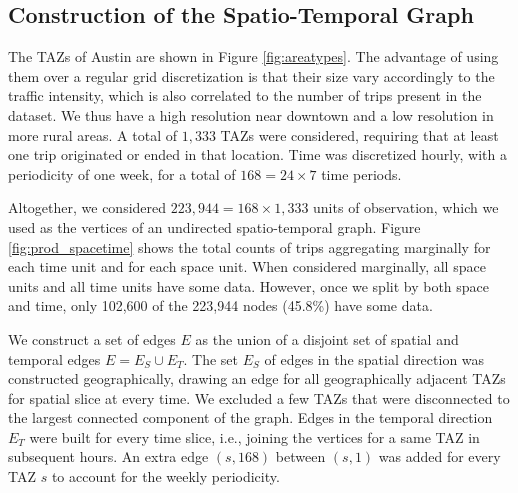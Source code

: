 \documentclass[a4paper, 11pt]{article}
\begin{document}
\subsection{Construction of the Spatio-Temporal Graph}
\label{section:graph}

The TAZs of Austin are shown in Figure \ref{fig:areatypes}. The advantage of using them over a regular grid discretization is that their size vary accordingly to the traffic intensity, which is also correlated to the number of trips present in the dataset. We thus have a high resolution near downtown and a low resolution in more rural areas. A total of $1,333$ TAZs were considered, requiring that at least one trip originated or ended in that location. Time was discretized hourly, with a periodicity of one week, for a total of $168=24\times7$ time periods.

Altogether, we considered $223,944=168\times1,333$ units of observation, which we used as the vertices of an undirected spatio-temporal graph. Figure \ref{fig:prod_spacetime} shows the total counts of trips aggregating marginally for each time unit and for each space unit. When considered marginally, all space units and all time units have some data. However, once we split by both space and time, only 102,600 of the 223,944 nodes (45.8\%) have some data. 

We construct a set of edges $E$ as the union of a disjoint set of spatial and temporal edges $E=E_S\cup E_T$. The set $E_S$ of edges in the spatial direction was constructed geographically, drawing an edge for all geographically adjacent TAZs for spatial slice at every time. We excluded a few TAZs that were disconnected to the largest connected component of the graph. Edges in the temporal direction $E_T$ were built for every time slice, i.e., joining the vertices for a same TAZ in subsequent hours. An extra edge $(s,168)$ between $(s,1)$ was added for every TAZ $s$ to account for the weekly periodicity. 
\end{document}
